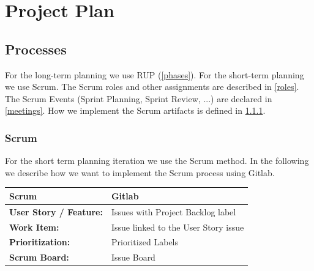 \chapter{Project Plan}

    
    

\section{Processes}
For the long-term planning we use RUP (\ref{phases}).
For the short-term planning we use Scrum.
The Scrum roles and other assignments are described in \ref{roles}.
The Scrum Events (Sprint Planning, Sprint Review, ...) are declared in \ref{meetings}.
How we implement the Scrum artifacts is defined in \ref{scrum}.

\subsection{Scrum}
\label{scrum}
For the short term planning iteration we use the Scrum method.
In the following we describe how we want to implement the Scrum process using Gitlab.

\begin{tabular}{l|l}
  \centering
  \textbf{Scrum} & \textbf{Gitlab} \\
  \hline
  \textbf{User Story / Feature:} & Issues with Project Backlog label \\
  \textbf{Work Item:} & Issue linked to the User Story issue \\
  \textbf{Prioritization:} & Prioritized Labels \\
  \textbf{Scrum Board:} & Issue Board \\
\end{tabular} \newline

